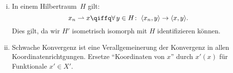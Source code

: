 \begin{thBemerkung}\hfill
    \begin{enumerate}[(i)]
        \item
            In einem Hilbertraum~$H$ gilt:
            \[ x_n\weakto x
                \qiffq \forall\,y\in H\colon\;
                \SP{x_n,y} \to \SP{x,y}
            . \] 
            Dies gilt, da wir $H'$ isometrisch isomorph mit $H$ identifizieren
            können.
            
        \item
            Schwache Konvergenz ist eine Verallgemeinerung der Konvergenz in
            allen Koordinatenrichtgungen. Ersetze \enquote{Koordinaten von $x$}
            durch $x'(x)$ für Funktionale $x'\in X'$.
    \end{enumerate}
\end{thBemerkung}
